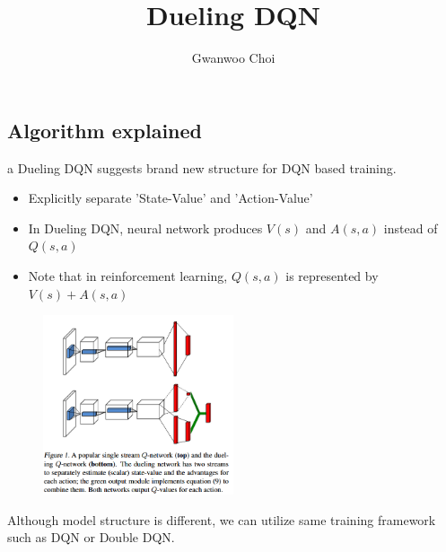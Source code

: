\documentclass[8pt]{beamer}
\title{Dueling DQN}
\author{Gwanwoo Choi}
\begin{document}
\begin{frame}
    \titlepage
\end{frame}

\subsection{Algorithm explained}


\begin{frame}{a}
    Dueling DQN suggests brand new structure for DQN based training.
    \begin{itemize}
        \item Explicitly separate 'State-Value' and 'Action-Value'
        \item In Dueling DQN, neural network produces $V(s)$ and $A(s,a)$ instead of $Q(s,a)$
        \item Note that in reinforcement learning, $Q(s,a)$ is represented by $V(s) + A(s,a)$
    \end{itemize}

    \begin{figure}
        \includegraphics[width=0.5\textwidth]{DuelingDQNStructure.png}
    \end{figure}
    Although model structure is different, we can utilize same training framework such as DQN or Double DQN.
\end{frame}
\end{document}
